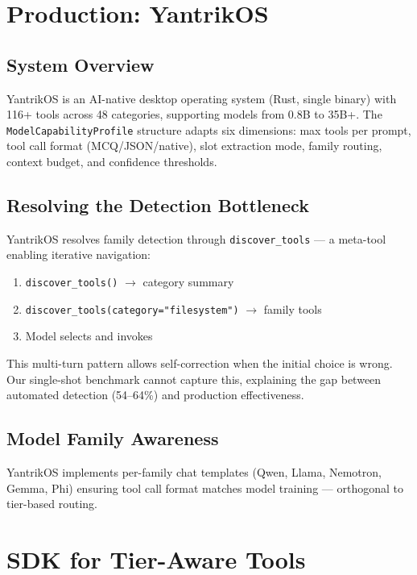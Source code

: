 \documentclass[11pt]{article}
\begin{document}
\section{Production: YantrikOS}

\subsection{System Overview}

YantrikOS is an AI-native desktop operating system (Rust, single binary) with 116+ tools across 48 categories, supporting models from 0.8B to 35B+. The \texttt{ModelCapabilityProfile} structure adapts six dimensions: max tools per prompt, tool call format (MCQ/JSON/native), slot extraction mode, family routing, context budget, and confidence thresholds.

\subsection{Resolving the Detection Bottleneck}

YantrikOS resolves family detection through \texttt{discover\_tools} --- a meta-tool enabling iterative navigation:
\begin{enumerate}[nosep,leftmargin=*]
  \item \texttt{discover\_tools()} $\rightarrow$ category summary
  \item \texttt{discover\_tools(category="filesystem")} $\rightarrow$ family tools
  \item Model selects and invokes
\end{enumerate}

This multi-turn pattern allows self-correction when the initial choice is wrong. Our single-shot benchmark cannot capture this, explaining the gap between automated detection (54--64\%) and production effectiveness.

\subsection{Model Family Awareness}

YantrikOS implements per-family chat templates (Qwen, Llama, Nemotron, Gemma, Phi) ensuring tool call format matches model training --- orthogonal to tier-based routing.

\section{SDK for Tier-Aware Tools}
\end{document}
